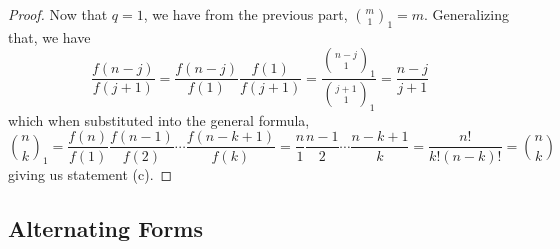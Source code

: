 \begin{proof}
    Now that \(q = 1\), we have from the previous part, \(\binom{m}{1}_1 = m\).
    Generalizing that, we have
    \begin{equation*}
        \frac{f(n-j)}{f(j+1)} = \frac{f(n-j)}{f(1)}\frac{f(1)}{f(j+1)}
        = \frac{\binom{n-j}{1}_1}{\binom{j+1}{1}_1}
        = \frac{n-j}{j+1}
    \end{equation*}
    which when substituted into the general formula,
    \begin{equation*}
        \binom{n}{k}_1 = \frac{f(n)}{f(1)}\frac{f(n-1)}{f(2)} \cdots \frac{f(n-k+1)}{f(k)}
        = \frac{n}{1}\frac{n-1}{2}\cdots\frac{n-k+1}{k}
        = \frac{n!}{k!(n-k)!} = \binom{n}{k}
    \end{equation*}
    giving us statement (c).
\end{proof}

\subsection*{Alternating Forms}

